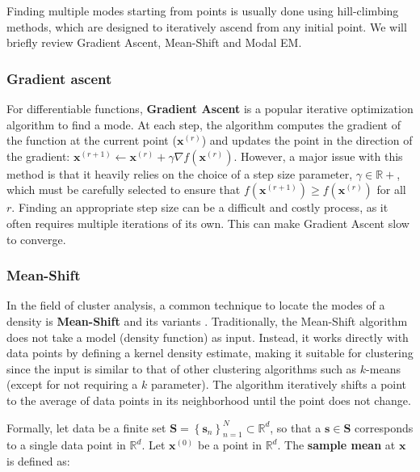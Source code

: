 \vspace{1em}

Finding multiple modes starting from points is usually done using hill-climbing methods, which are designed to iteratively ascend from any initial point. We will briefly review Gradient Ascent, Mean-Shift and Modal EM.

\subsubsection{Gradient ascent}

For differentiable functions, \textbf{Gradient Ascent} \citep{Murphy2012} is a popular iterative optimization algorithm to find a mode. At each step, the algorithm computes the gradient of the function at the current point ($\mathbf{x}^{(r)}$) and updates the point in the direction of the gradient: $\mathbf{x}^{(r+1)} \gets \mathbf{x}^{(r)} + \gamma \nabla f\left(\mathbf{x}^{(r)}\right)$. However, a major issue with this method is that it heavily relies on the choice of a step size parameter, $\gamma \in \mathbb{R}+$, which must be carefully selected to ensure that $f\left(\mathbf{x}^{(r+1)}\right) \geq f\left(\mathbf{x}^{(r)}\right)$ for all $r$. Finding an appropriate step size can be a difficult and costly process, as it often requires multiple iterations of its own. This can make Gradient Ascent slow to converge.

\subsubsection{Mean-Shift}

In the field of cluster analysis, a common technique to locate the modes of a density is \textbf{Mean-Shift} and its variants \citep{Fukunaga1975, Carreira-Perpinan2015}. Traditionally, the Mean-Shift algorithm does not take a model (density function) as input. Instead, it works directly with data points by defining a kernel density estimate, making it suitable for clustering since the input is similar to that of other clustering algorithms such as $k$-means (except for not requiring a $k$ parameter). The algorithm iteratively shifts a point to the average of data points in its neighborhood until the point does not change.

Formally, let data be a finite set $\mathbf{S} = \left\{\mathbf{s}_n\right\}_{n=1}^N \subset \mathbb{R}^d$, so that a $\mathbf{s} \in \mathbf{S}$ corresponds to a single data point in $\mathbb{R}^d$. Let $\mathbf{x}^{(0)}$ be a point in $\mathbb{R}^d$. The \textbf{sample mean} at $\mathbf{x}$ is defined as:

